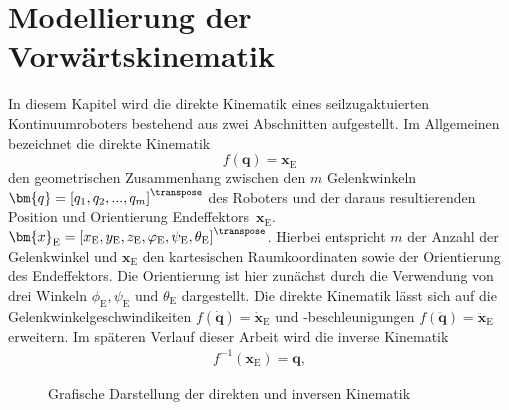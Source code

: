 \chapter{Modellierung der Vorwärtskinematik}
\label{ch:vorwaertskinematik}

In diesem Kapitel wird die direkte Kinematik eines seilzugaktuierten Kontinuumroboters bestehend aus zwei Abschnitten aufgestellt. Im Allgemeinen bezeichnet die direkte Kinematik 
%
\begin{equation}
\label{eq:direkteKinematik}
f(\bm{q}) = \bm{x}_\mathrm{E}
\end{equation}
%
den geometrischen Zusammenhang zwischen den $m$ Gelenkwinkeln $\bm{q} = \left[q_1, q_2, ..., q_m \right]^\transpose $ des Roboters und der daraus resultierenden Position und Orientierung Endeffektors~$\bm{x}_\mathrm{E}$.
$\bm{x}_\mathrm{E} = \left[x_\mathrm{E}, y_\mathrm{E}, z_\mathrm{E}, \varphi_\mathrm{E}, \psi_\mathrm{E}, \theta_\mathrm{E} \right]^\transpose $. Hierbei entspricht $m$ der Anzahl der Gelenkwinkel und $\bm{x}_\mathrm{E}$ den kartesischen Raumkoordinaten sowie der Orientierung des Endeffektors. Die Orientierung ist hier zunächst durch die Verwendung von drei Winkeln $\phi_\mathrm{E}, \psi_\mathrm{E}$ und $\theta_\mathrm{E}$ dargestellt. 
Die direkte Kinematik lässt sich auf die Gelenkwinkelgeschwindikeiten $f(\bm{\dot{q}}) = \bm{\dot{x}}_\mathrm{E} $ und -beschleunigungen $f(\bm{\ddot{q}}) = \bm{\ddot{x}}_\mathrm{E}$ erweitern. Im späteren Verlauf dieser Arbeit wird die inverse Kinematik
%
\begin{align}
f^{-1}(\bm{x}_\mathrm{E}) = \bm{q},
\label{eq:inverseKinematik}
\end{align}

\begin{figure}[b]
\centering
{}
\caption{Grafische Darstellung der direkten und inversen Kinematik}
\label{fig:kinematik}
\end{figure}

